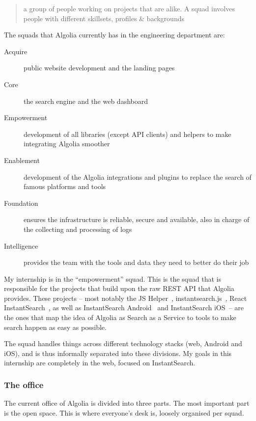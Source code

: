 \begin{quotation}
  a group of people working on projects that are alike. A squad involves people with different skillsets, profiles \& backgrounds
\end{quotation}

The squads that Algolia currently has in the engineering department are:

\begin{description}
  \item[Acquire] public website development and the landing pages
  \item[Core] the search engine and the web dashboard
  \item[Empowerment] development of all libraries (except API clients) and helpers to make integrating Algolia smoother
  \item[Enablement] development of the Algolia integrations and plugins to replace the search of famous platforms and tools
  \item[Foundation] ensures the infrastructure is reliable, secure and available, also in charge of the collecting and processing of logs
  \item[Intelligence] provides the team with the tools and data they need to better do their job
\end{description}

My internship is in the ``empowerment'' squad. This is the squad that is responsible for the projects that build upon the raw REST API that Algolia provides. These projects -- most notably the JS Helper~\cite{algolia-js-helper}, instantsearch.js~\cite{instantsearch-js}, React InstantSearch~\cite{react-instantsearch}, as well as InstantSearch Android~\cite{instantsearch-android} and InstantSearch iOS~\cite{instantsearch-ios}-- are the ones that map the idea of Algolia as Search as a Service to tools to make search happen as easy as possible.

The squad handles things across different technology stacks (web, Android and iOS), and is thus informally separated into these divisions. My goals in this internship are completely in the web, focused on InstantSearch.

\subsubsection{The office} %
\label{ssub:the_office}

The current office of Algolia is divided into three parts. The most important part is the open space. This is where everyone's desk is, loosely organised per squad.

